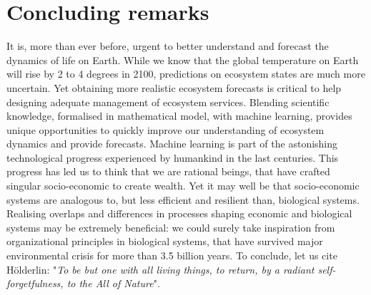 % 



\section{Concluding remarks}

It is, more than ever before, urgent to better understand and forecast the dynamics of life on Earth.
% 
While we know that the global temperature on Earth will rise by 2 to 4 degrees in 2100, predictions on ecosystem states are much more uncertain. Yet obtaining more realistic ecosystem forecasts is critical to help designing adequate management of ecosystem services.
% 
Blending scientific knowledge, formalised in mathematical model, with machine learning, provides unique opportunities to quickly improve our understanding of ecosystem dynamics and provide forecasts. %
% 
Machine learning is part of the astonishing technological progress experienced by humankind in the last centuries. This progress has led us to think that we are rational beings, that have crafted singular socio-economic to create wealth. Yet it may well be that socio-economic systems are analogous to, but less efficient and resilient than, biological systems. 
% 
Realising overlaps and differences in processes shaping economic and biological systems may be extremely beneficial: we could surely take inspiration from organizational principles in biological systems, that have survived major environmental crisis for more than 3.5 billion years.
% 
To conclude, let us cite Hölderlin: "\textit{To be but one with all living things, to return, by a radiant self-forgetfulness, to the All of Nature}". 













